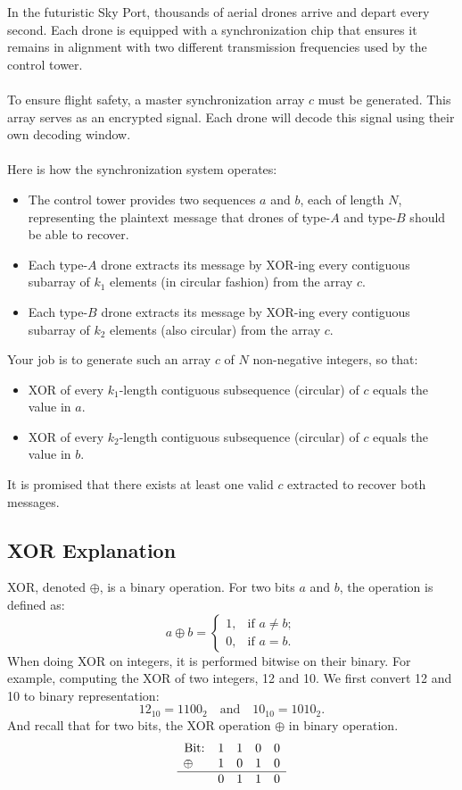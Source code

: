 \documentclass[12pt,a4paper]{article}
\begin{document}
\noindent
In the futuristic Sky Port, thousands of aerial drones arrive and depart every second. Each drone is equipped with a synchronization chip that ensures it remains in alignment with two different transmission frequencies used by the control tower.
\\\\
\noindent
To ensure flight safety, a master synchronization array $c$ must be generated. This array serves as an encrypted signal. Each drone will decode this signal using their own decoding window.
\\\\
\noindent
Here is how the synchronization system operates:
\begin{itemize}
    \item The control tower provides two sequences $a$ and $b$, each of length $N$, representing the plaintext message that drones of type-$A$ and type-$B$ should be able to recover.
    \item Each type-$A$ drone extracts its message by XOR-ing every contiguous subarray of $k_1$ elements (in circular fashion) from the array $c$.
    \item Each type-$B$ drone extracts its message by XOR-ing every contiguous subarray of $k_2$ elements (also circular) from the array $c$.
\end{itemize}
\noindent
Your job is to generate such an array $c$ of $N$ non-negative integers, so that:
\begin{itemize}
    \item XOR of every $k_1$-length contiguous subsequence (circular) of $c$ equals the value in $a$.
    \item XOR of every $k_2$-length contiguous subsequence (circular) of $c$ equals the value in $b$.
\end{itemize}

\noindent
It is promised that there exists at least one valid $c$ extracted to recover both messages.

\subsection*{\fontsize{16}{12}XOR Explanation}
XOR, denoted $\oplus$, is a binary operation. For two bits $a$ and $b$, the operation is defined as:
    \[
    a \oplus b =
    \begin{cases}
    1, & \text{if } a \neq b; \\
    0, & \text{if } a = b.
    \end{cases}
    \]
\noindent
When doing XOR on integers, it is performed bitwise on their binary.
For example, computing the XOR of two integers, 12 and 10.
We first convert 12 and 10 to binary representation:
\[
12_{10} = 1100_2 \quad \text{and} \quad 10_{10} = 1010_2.
\]
\noindent
And recall that for two bits, the XOR operation $\oplus$ in binary operation.
\[
\begin{array}{ccccc}
\text{Bit:} & 1 & 1 & 0 & 0 \\
\oplus \quad & 1 & 0 & 1 & 0 \\
\hline&0&1&1&0 \\
\end{array}
\]
\end{document}

